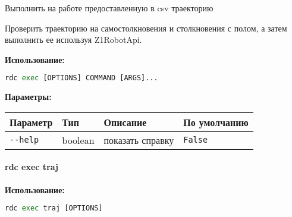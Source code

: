 Выполнить на работе предоставленную в csv траекторию

Проверить траекторию на самостолкновения и столкновения с полом, а затем выполнить ее используя Z1RobotApi.

\textbf{Использование:}
\begin{lstlisting}[language=python, numbers=none, frame=single]
rdc exec [OPTIONS] COMMAND [ARGS]...
\end{lstlisting}

\textbf{Параметры:}
\begin{center}
\fontsize{10pt}{10pt}\selectfont
\begin{longtable}[]{p{5cm}|p{2cm}|p{3.5cm}|p{5cm}}
    \hline
\toprule()
Параметр & Тип & Описание & По умолчанию \\
\hline
\midrule()
\endhead
\texttt{-\/-help} & boolean & показать справку &
\texttt{False} \\
\bottomrule()
\hline
\end{longtable}
\end{center}

\hypertarget{rdc-exec-traj}{%
\paragraph{rdc exec traj}\label{rdc-exec-traj}}

\textbf{Использование:}
\begin{lstlisting}[language=python, numbers=none, frame=single]
rdc exec traj [OPTIONS]
\end{lstlisting}

